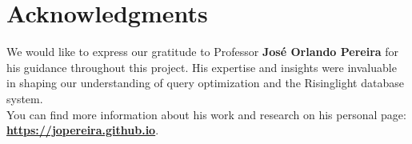 \documentclass[a4paper,12pt]{scrreprt}
\renewcommand{\headrulewidth}{0pt} %
\begin{document}
\section{Acknowledgments}
We would like to express our gratitude to Professor \textbf{José Orlando Pereira} for his guidance throughout this project. His expertise and insights were invaluable in shaping our understanding of query optimization and the Risinglight database system. \\
You can find more information about his work and research on his personal page:\\
\textbf{ \href{https://jopereira.github.io}{https://jopereira.github.io}}. \\



\renewcommand{\headrulewidth}{0pt}
\end{document}
